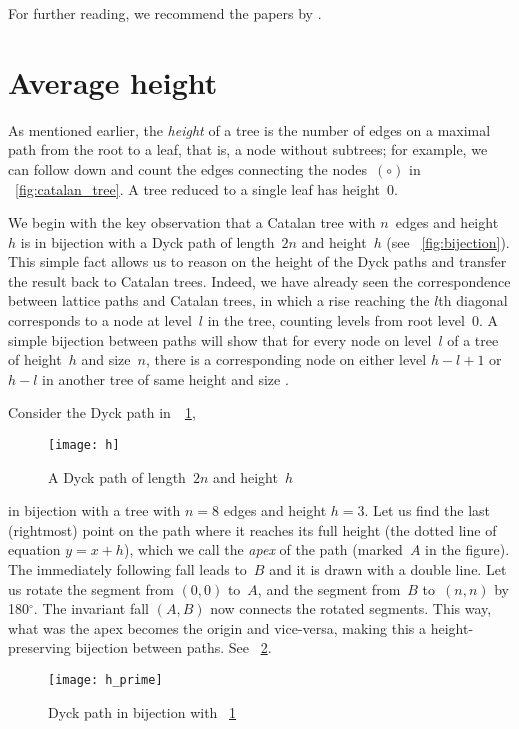 For further reading, we recommend the papers by
\citet*{DershwowitzZaks_1980,DershowitzZaks_1981,DershowitzZaks_1990}.

\section{Average height}
\label{sec:Catalan_height}

As mentioned earlier, the \emph{height} of a tree is the number of
edges on a maximal path from the root to a leaf, that is, a node
without subtrees; for example, we can follow down and count the edges
connecting the nodes~\((\circ)\) in \fig~\ref{fig:catalan_tree}. A
tree reduced to a single leaf has height~\(0\).

We begin with the key observation that a Catalan tree with \(n\)~edges
and height~\(h\) is in bijection with a Dyck path of length~\(2n\) and
height~\(h\) (see \fig~\vref{fig:bijection}). This simple fact allows
us to reason on the height of the Dyck paths and transfer the result
back to Catalan trees. Indeed, we have already seen the correspondence
between lattice paths and Catalan trees, in which a rise reaching the
$l$th diagonal corresponds to a node at level~$l$ in the tree,
counting levels from root level~$0$. A simple bijection between paths
will show that for every node on level~$l$ of a tree of height~$h$ and
size~$n$, there is a corresponding node on either level $h-l+1$ or
$h-l$ in another tree of same height and size
\citep{Rinderknecht_2013d}.

Consider the Dyck path in~\Fig~\ref{fig:h},
\begin{figure}
\centering
\texttt{[image: h]}
\caption{A Dyck path of length~\(2n\) and height~\(h\)}
\label{fig:h}
\end{figure}
in bijection with a tree with \(n=8\) edges and height \(h=3\). Let us
find the last (rightmost) point on the path where it reaches its full
height (the dotted line of equation \(y = x + h\)), which we call the
\emph{apex} of the path (marked~$A$ in the figure). The immediately
following fall leads to~$B$ and it is drawn with a double line. Let us
rotate the segment from $(0,0)$ to~$A$, and the segment from~$B$
to~$(n,n)$ by 180$^\circ$. The invariant fall $(A,B)$ now connects the
rotated segments. This way, what was the apex becomes the origin and
vice\hyp{}versa, making this a height\hyp{}preserving bijection
between paths. See \fig~\ref{fig:h_prime}.
\begin{figure}
\centering
\texttt{[image: h\_prime]}
\caption{Dyck path in bijection with \fig~\ref{fig:h}}
\label{fig:h_prime}
\end{figure}

